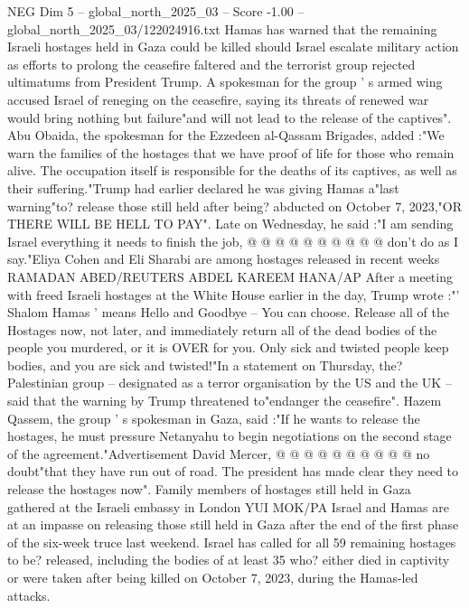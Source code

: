 \begin{textsample}{NEG Dim 5 – global\_north\_2025\_03 – Score -1.00 – global\_north\_2025\_03/122024916.txt}  \label{ex:f5_neg_259}
Hamas has warned that the remaining Israeli hostages held in Gaza could be killed should Israel escalate military action as efforts to prolong the ceasefire faltered and the terrorist group rejected ultimatums from President Trump.
A spokesman for the group ' s armed wing accused Israel of reneging on the ceasefire, saying its threats of renewed war would bring nothing but failure"and will not lead to the release of the captives".
Abu Obaida, the spokesman for the Ezzedeen al-Qassam Brigades, added :"We warn the families of the hostages that we have proof of life for those who remain alive.
The occupation itself is responsible for the deaths of its captives, as well as their suffering."Trump had earlier declared he was giving Hamas a"last warning"to? release those still held after being? abducted on October 7, 2023,"OR THERE WILL BE HELL TO PAY".
Late on Wednesday, he said :"I am sending Israel everything it needs to finish the job, @ @ @ @ @ @ @ @ @ @ don't do as I say."Eliya Cohen and Eli Sharabi are among hostages released in recent weeks RAMADAN ABED/REUTERS ABDEL KAREEM HANA/AP After a meeting with freed Israeli hostages at the White House earlier in the day, Trump wrote :"' Shalom Hamas ' means Hello and Goodbye -- You can choose.
Release all of the Hostages now, not later, and immediately return all of the dead bodies of the people you murdered, or it is OVER for you.
Only sick and twisted people keep bodies, and you are sick and twisted!"In a statement on Thursday, the?
Palestinian group -- designated as a terror organisation by the US and the UK -- said that the warning by Trump threatened to"endanger the ceasefire".
Hazem Qassem, the group ' s spokesman in Gaza, said :"If he wants to release the hostages, he must pressure Netanyahu to begin negotiations on the second stage of the agreement."Advertisement David Mercer, @ @ @ @ @ @ @ @ @ @ no doubt"that they have run out of road.
The president has made clear they need to release the hostages now".
Family members of hostages still held in Gaza gathered at the Israeli embassy in London YUI MOK/PA Israel and Hamas are at an impasse on releasing those still held in Gaza after the end of the first phase of the six-week truce last weekend.
Israel has called for all 59 remaining hostages to be? released, including the bodies of at least 35 who? either died in captivity or were taken after being killed on October 7, 2023, during the Hamas-led attacks.

\end{textsample}
